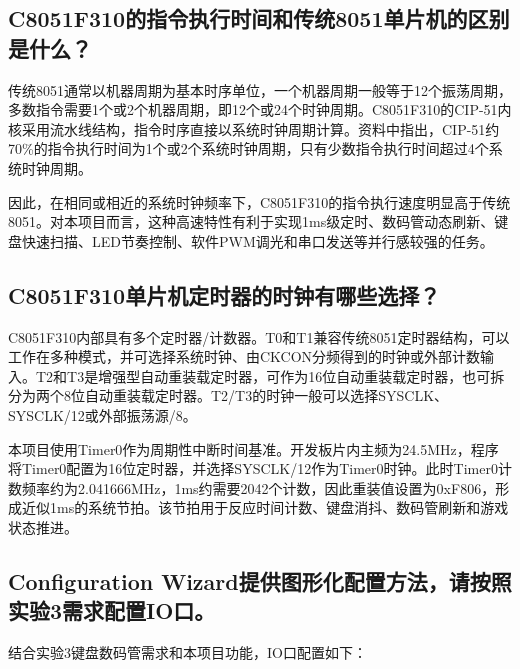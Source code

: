 ﻿\documentclass[UTF8,a4paper,12pt]{ctexart}
\begin{document}
\subsection{C8051F310的指令执行时间和传统8051单片机的区别是什么？}
传统8051通常以机器周期为基本时序单位，一个机器周期一般等于12个振荡周期，多数指令需要1个或2个机器周期，即12个或24个时钟周期。C8051F310的CIP-51内核采用流水线结构，指令时序直接以系统时钟周期计算。资料中指出，CIP-51约70\%的指令执行时间为1个或2个系统时钟周期，只有少数指令执行时间超过4个系统时钟周期。

因此，在相同或相近的系统时钟频率下，C8051F310的指令执行速度明显高于传统8051。对本项目而言，这种高速特性有利于实现1ms级定时、数码管动态刷新、键盘快速扫描、LED节奏控制、软件PWM调光和串口发送等并行感较强的任务。

\subsection{C8051F310单片机定时器的时钟有哪些选择？}
C8051F310内部具有多个定时器/计数器。T0和T1兼容传统8051定时器结构，可以工作在多种模式，并可选择系统时钟、由CKCON分频得到的时钟或外部计数输入。T2和T3是增强型自动重装载定时器，可作为16位自动重装载定时器，也可拆分为两个8位自动重装载定时器。T2/T3的时钟一般可以选择SYSCLK、SYSCLK/12或外部振荡源/8。

本项目使用Timer0作为周期性中断时间基准。开发板片内主频为24.5MHz，程序将Timer0配置为16位定时器，并选择SYSCLK/12作为Timer0时钟。此时Timer0计数频率约为2.041666MHz，1ms约需要2042个计数，因此重装值设置为0xF806，形成近似1ms的系统节拍。该节拍用于反应时间计数、键盘消抖、数码管刷新和游戏状态推进。

\subsection{Configuration Wizard提供图形化配置方法，请按照实验3需求配置IO口。}
结合实验3键盘数码管需求和本项目功能，IO口配置如下：
\end{document}
